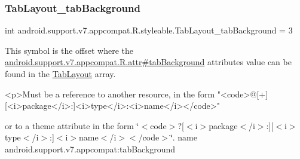 \mbox{\label{classandroid_1_1support_1_1v7_1_1appcompat_1_1R_1_1styleable_ae47f32276712afa05b06431da195e5bb}} 
\subsubsection{\texorpdfstring{Tab\+Layout\+\_\+tab\+Background}{TabLayout\_tabBackground}}
{\footnotesize\ttfamily int android.\+support.\+v7.\+appcompat.\+R.\+styleable.\+Tab\+Layout\+\_\+tab\+Background = 3\hspace{0.3cm}{\ttfamily [static]}}

This symbol is the offset where the \hyperlink{classandroid_1_1support_1_1v7_1_1appcompat_1_1R_1_1attr_a71cdff75d6b555ac21d02a8b344827ad}{android.\+support.\+v7.\+appcompat.\+R.\+attr\#tab\+Background} attribute\textquotesingle{}s value can be found in the \hyperlink{classandroid_1_1support_1_1v7_1_1appcompat_1_1R_1_1styleable_a3c85d0c4cebbccf5b1a16ecfe13938ca}{Tab\+Layout} array.

\begin{DoxyVerb}      <p>Must be a reference to another resource, in the form "<code>@[+][<i>package</i>:]<i>type</i>:<i>name</i></code>"
\end{DoxyVerb}
 or to a theme attribute in the form \char`\"{}$<$code$>$?\mbox{[}$<$i$>$package$<$/i$>$\+:\mbox{]}\mbox{[}$<$i$>$type$<$/i$>$\+:\mbox{]}$<$i$>$name$<$/i$>$$<$/code$>$\char`\"{}.  name android.\+support.\+v7.\+appcompat\+:tab\+Background \mbox{\label{classandroid_1_1support_1_1v7_1_1appcompat_1_1R_1_1styleable_ac351b0e0ca156fa1d4e6ed647ade8ac6}} 
